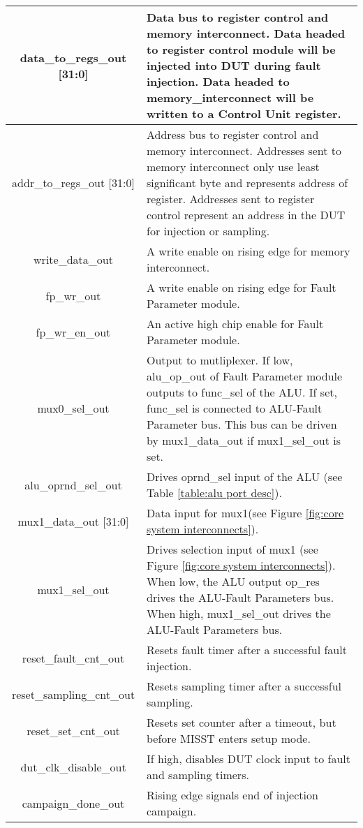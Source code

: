 \documentclass[]{report}
\begin{document}
\begin{center}
\begin{longtable}{|c|p{11cm}|}
		\hline
		data\_to\_regs\_out [31:0] & Data bus to register control and memory interconnect. Data headed to register control module will be injected into DUT during fault injection. Data headed to memory\_interconnect will be written to a Control Unit register.\\  
		\hline
		addr\_to\_regs\_out [31:0] & Address bus to register control and memory interconnect. Addresses sent to memory interconnect only use least significant byte and represents address of register. Addresses sent to register control represent an address in the DUT for injection or sampling.\\     
		\hline
		write\_data\_out & A write enable on rising edge for memory interconnect.\\         
		\hline
		fp\_wr\_out & A write enable on rising edge for Fault Parameter module.\\             
		\hline
		fp\_wr\_en\_out & An active high chip enable for Fault Parameter module.\\           
		\hline
		mux0\_sel\_out & Output to mutliplexer. If low, alu\_op\_out of Fault Parameter module outputs to func\_sel of the ALU. If set, func\_sel is connected to ALU-Fault Parameter bus. This bus can be driven by mux1\_data\_out if mux1\_sel\_out is set.\\          
		\hline
		alu\_oprnd\_sel\_out & Drives oprnd\_sel input of the ALU (see Table \ref{table:alu port desc}).\\       
		\hline
		mux1\_data\_out [31:0] & Data input for mux1(see Figure \ref{fig:core system interconnects}).\\      
		\hline
		mux1\_sel\_out & Drives selection input of mux1 (see Figure \ref{fig:core system interconnects}). When low, the ALU output op\_res drives the ALU-Fault Parameters bus. When high, mux1\_sel\_out drives the ALU-Fault Parameters bus.\\          
		\hline
		reset\_fault\_cnt\_out & Resets fault timer after a successful fault injection.\\   
		\hline
		reset\_sampling\_cnt\_out & Resets sampling timer after a successful sampling.\\ 
		\hline
		reset\_set\_cnt\_out & Resets set counter after a timeout, but before MISST enters setup mode.\\     
		\hline
		dut\_clk\_disable\_out & If high, disables DUT clock input to fault and sampling timers.\\    
		\hline
		campaign\_done\_out & Rising edge signals end of injection campaign.\\
		\hline      
	\end{longtable} 
\end{center}
\end{document}
